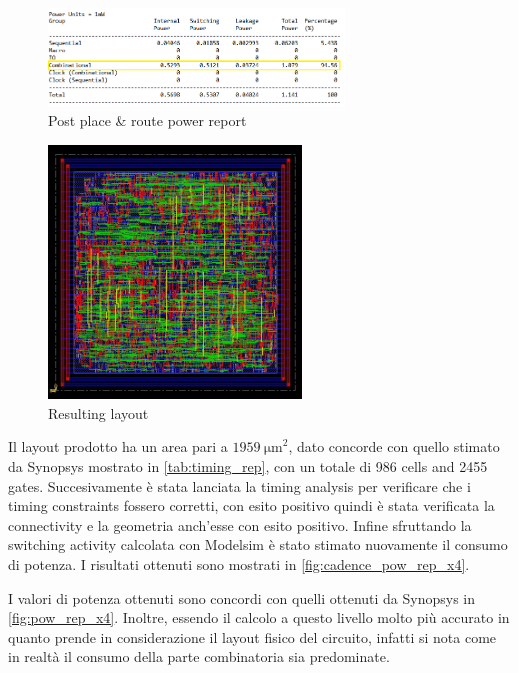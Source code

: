 \begin{figure}[htb]
	\center
	\includegraphics[width=0.7\textwidth]{images/rep_power_x4_cadence_mod.png}
	\caption{Post place \& route power report}
	\label{fig:cadence_pow_rep_x4}
\end{figure}

\begin{figure}[htb]
	\center
	\includegraphics[width=0.6\textwidth]{images/IIR_filter_period_min_x4_place.jpg}
	\caption{Resulting layout}
	\label{fig:layout}
\end{figure}

Il layout prodotto ha un area pari a $\SI{1959}{\micro\meter}^2$, dato concorde con quello stimato da Synopsys mostrato in \autoref{tab:timing_rep}, con un totale di 986 cells and 2455 gates. Succesivamente è stata lanciata la timing analysis per verificare che i timing constraints fossero corretti, con esito positivo quindi è stata verificata la connectivity e la geometria anch'esse con esito positivo. Infine sfruttando la switching activity calcolata con Modelsim è stato stimato nuovamente il consumo di potenza. I risultati ottenuti sono mostrati in \autoref{fig:cadence_pow_rep_x4}.


I valori di potenza ottenuti sono concordi con quelli ottenuti da Synopsys in \autoref{fig:pow_rep_x4}. Inoltre, essendo il calcolo a questo livello molto più accurato in quanto prende in considerazione il layout fisico del circuito, infatti si nota come in realtà il consumo della parte combinatoria sia predominate.

\pagebreak
